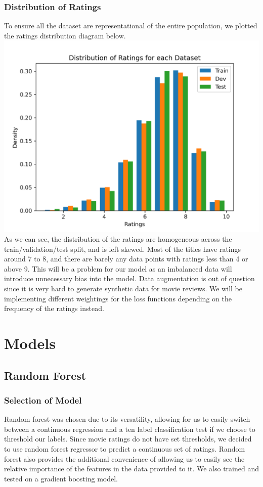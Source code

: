 \documentclass[11pt]{article}
\newcommand{\np}{\newpage}
\begin{document}
\subsubsection{Distribution of Ratings}
To ensure all the dataset are representational of the entire population, we plotted the ratings distribution diagram below.\\[2mm]
\includegraphics[scale=1]{data_split_distributions.png}\\[2mm]

As we can see, the distribution of the ratings are homogeneous across the train/validation/test split, and is left skewed.  Most of the titles have ratings around 7 to 8, and there are barely any data points with ratings less than 4 or above 9.  This will be a problem for our model as an imbalanced data will introduce unnecessary bias into the model.  Data augmentation is out of question since it is very hard to generate synthetic data for movie reviews.  We will be implementing different weightings for the loss functions depending on the frequency of the ratings instead.
\np



\section{Models}
\subsection{Random Forest}
\subsubsection{Selection of Model}
Random forest was chosen due to its versatility, allowing for us to easily switch between a continuous regression and a ten label classification test if we choose to threshold our labels.  Since movie ratings do not have set thresholds, we decided to use random forest regressor to predict a continuous set of ratings.  Random forest also provides the additional convenience of allowing us to easily see the relative importance of the features in the data provided to it.  We also trained and tested on a gradient boosting model.
\end{document}
